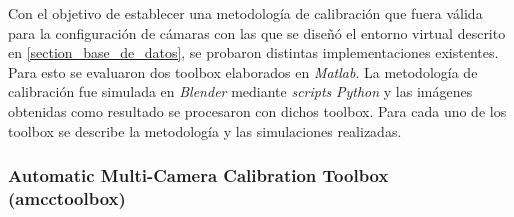  
 
 
 Con el objetivo de establecer una metodología de calibración que fuera válida para la configuración de cámaras con las que se diseñó el entorno virtual descrito en \ref{section_base_de_datos}, se probaron distintas implementaciones existentes. Para esto se evaluaron dos toolbox elaborados en \emph{Matlab}. La metodología de calibración fue simulada en \emph{Blender} mediante \textit{scripts} \emph{Python} y las imágenes obtenidas como resultado se procesaron con dichos toolbox. Para cada uno de los toolbox se describe la metodología y las simulaciones realizadas.
 
 
\subsubsection{Automatic Multi-Camera Calibration Toolbox (amcctoolbox) }\cite{amcctoolbox}  


